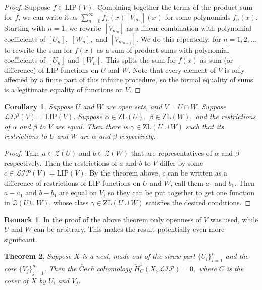 \documentclass[10pt]{article}
\newtheorem{theorem}{Theorem}
\newtheorem{corollary}[theorem]{Corollary}
\theoremstyle{definition}
\newtheorem{remark}{Remark}
\begin{document}
\begin{proof}
Suppose $f\in \textrm{LIP} (V).$ Combining together the terms of  the product-sum for $f$, we can write it as $\sum_{n=0}^{\infty} f_n(x) [V_{m_n}](x)$ for some polynomials $f_n(x).$ 
Starting with $n=1$, we rewrite $[V_{m_n}]$ as a linear combination with polynomial coefficients of  $[U_n],$ $[W_n],$ and $[V_{m_{n+1}}]$. We do this repeatedly, for $n=1,2,\dots$ to rewrite the sum for $f(x)$ as a sum of product-sums with polynomial coefficients of $[U_n]$ and $[W_n].$ This splits the sum for $f(x)$ as sum (or difference) of LIP functions on $U$ and $W.$ Note that every element of $V$ is only affected by a finite part of this infinite procedure, so the formal equality of sums is a legitimate equality of functions on $V.$
\end{proof}

\begin{corollary} \label{GlueZL} Suppose $U$ and $W$ are open sets, and $V=U\cap W.$ Suppose $\mathcal{LIP}(V)=\textrm{LIP}(V).$ Suppose $\alpha \in \textrm{ZL}(U),$ $\beta\in \textrm{ZL}(W),$ and the restrictions of $\alpha$ and $\beta$ to $V$ are equal. Then there is $\gamma \in \textrm{ZL}(U\cup W)$ such that its restrictions to $U$ and $W$ are $\alpha$ and $\beta$ respectively.
\end{corollary}

\begin{proof} Take $a\in \mathcal{Z}(U)$ and $b\in \mathcal{Z}(W)$ that are representatives of $\alpha$ and $\beta$ respectively. Then the restrictions of $a$ and $b$ to $V$ differ by some $c\in \mathcal{LIP}(V)=\textrm{LIP}(V).$ By the theorem above, $c$ can be written as a difference of restrictions of LIP functions on $U$ and $W$, call them $a_1$ and $b_1$. Then $a-a_1$ and $b-b_1$ are equal on $V$, so they can be put together to get one function in $\mathcal{Z}(U\cup W)$, whose class $\gamma \in \textrm{ZL}(U\cup W)$ satisfies the desired conditions.
\end{proof}

\begin{remark} In the proof of the above theorem only openness of $V$ was used, while $U$ and $W$ can be arbitrary. This makes the result potentially even more significant.
\end{remark}


\begin{theorem} \label{H1nest}Suppose $X$ is a nest, made out of the straw part $\{U_i\}_{i=1}^n$ and the core $\{V_j\}_{j=1}^m$. Then the $\check{\textrm{Ce}}$ch cohomology $\check{H}^1_{C} (X,\mathcal {LIP})=0,$ where $C$ is the cover of $X$ by $U_i$ and $V_j$.
\end{theorem}
\end{document}

